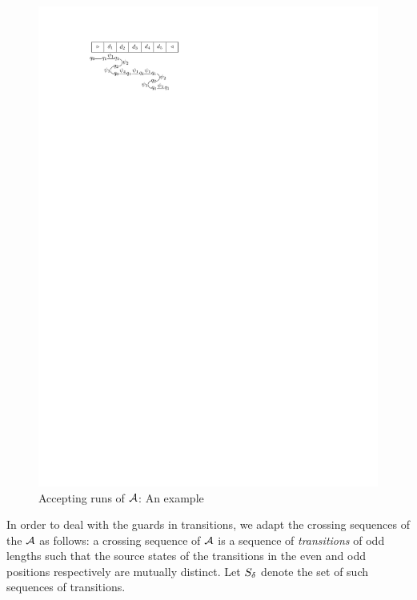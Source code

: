 \begin{figure}[htbp]
\begin{center}
\includegraphics{2sa-sa-exmp.pdf}
\end{center}
\caption{Accepting runs of $\mathcal{A}$: An example}\label{fig-2sa-sa}
\end{figure}

In order to deal with the guards in transitions, we adapt the crossing sequences of the \SSA{} $\mathcal{A}$  as follows: a crossing sequence of $\mathcal{A}$ is a sequence of \emph{transitions} of odd lengths such that  the source states of the transitions in the even and odd  positions respectively are mutually distinct. Let $S_{\delta}$ denote the set of such sequences of transitions. 


